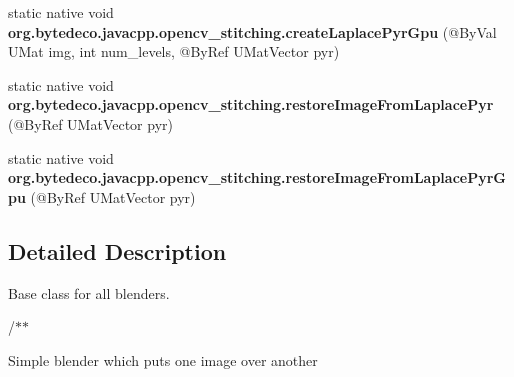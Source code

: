 \begin{DoxyCompactItemize}
\item 
\mbox{\label{group__stitching__blend_gaacc322c704563a6533e460fc65266b42}} 
static native void {\bfseries org.\+bytedeco.\+javacpp.\+opencv\+\_\+stitching.\+create\+Laplace\+Pyr\+Gpu} (@By\+Val U\+Mat img, int num\+\_\+levels, @By\+Ref U\+Mat\+Vector pyr)
\item 
\mbox{\label{group__stitching__blend_ga661f35a5a6439d0dc39a48008570cbdd}} 
static native void {\bfseries org.\+bytedeco.\+javacpp.\+opencv\+\_\+stitching.\+restore\+Image\+From\+Laplace\+Pyr} (@By\+Ref U\+Mat\+Vector pyr)
\item 
\mbox{\label{group__stitching__blend_ga774e9e1651a8e522dc8200bf352dc987}} 
static native void {\bfseries org.\+bytedeco.\+javacpp.\+opencv\+\_\+stitching.\+restore\+Image\+From\+Laplace\+Pyr\+Gpu} (@By\+Ref U\+Mat\+Vector pyr)
\end{DoxyCompactItemize}


\subsection{Detailed Description}
Base class for all blenders. 

/$\ast$$\ast$

Simple blender which puts one image over another 